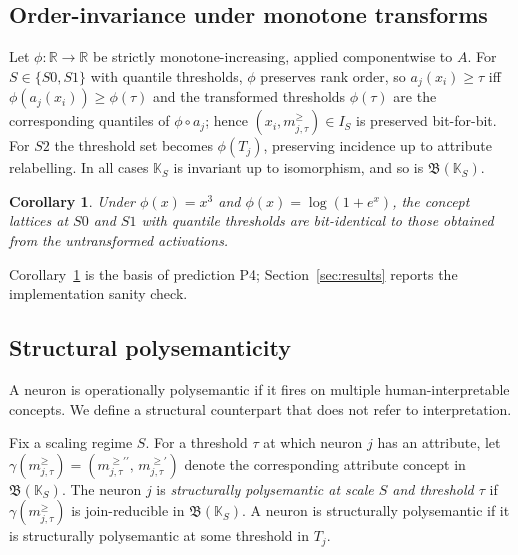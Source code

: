 \documentclass[a4paper,fleqn]{cas-dc}
\newtheorem{corollary}[theorem]{Corollary}
\newcommand{\R}{\mathbb{R}}
\newcommand{\K}{\mathbb{K}}
\newcommand{\Lat}{\mathfrak{B}}
\begin{document}
\subsection{Order-invariance under monotone transforms}

\begin{remark}\label{rem:invariance}
Let $\phi : \R \to \R$ be strictly monotone-increasing, applied componentwise to $A$.
For $S \in \{S0, S1\}$ with quantile thresholds, $\phi$ preserves rank order, so $a_j(x_i) \ge \tau$ iff $\phi(a_j(x_i)) \ge \phi(\tau)$ and the transformed thresholds $\phi(\tau)$ are the corresponding quantiles of $\phi \circ a_j$; hence $(x_i, m_{j,\tau}^{\ge}) \in I_S$ is preserved bit-for-bit.
For $S2$ the threshold set becomes $\phi(T_j)$, preserving incidence up to attribute relabelling.
In all cases $\K_S$ is invariant up to isomorphism, and so is $\Lat(\K_S)$.
\end{remark}

\begin{corollary}\label{cor:bit-identical}
Under $\phi(x) = x^3$ and $\phi(x) = \log(1 + e^x)$, the concept lattices at $S0$ and $S1$ with quantile thresholds are bit-identical to those obtained from the untransformed activations.
\end{corollary}

\noindent Corollary~\ref{cor:bit-identical} is the basis of prediction P4; Section~\ref{sec:results} reports the implementation sanity check.

\subsection{Structural polysemanticity}

A neuron is operationally polysemantic if it fires on multiple human-interpretable concepts.
We define a structural counterpart that does not refer to interpretation.

\begin{definition}\label{def:struct-poly}
Fix a scaling regime $S$.
For a threshold $\tau$ at which neuron $j$ has an attribute, let $\gamma(m_{j,\tau}^{\ge}) = (m_{j,\tau}^{\ge\prime\prime},\, m_{j,\tau}^{\ge\prime})$ denote the corresponding attribute concept in $\Lat(\K_S)$.
The neuron $j$ is \emph{structurally polysemantic at scale $S$ and threshold $\tau$} if $\gamma(m_{j,\tau}^{\ge})$ is join-reducible in $\Lat(\K_S)$.
A neuron is structurally polysemantic if it is structurally polysemantic at some threshold in $T_j$.
\end{definition}
\end{document}

